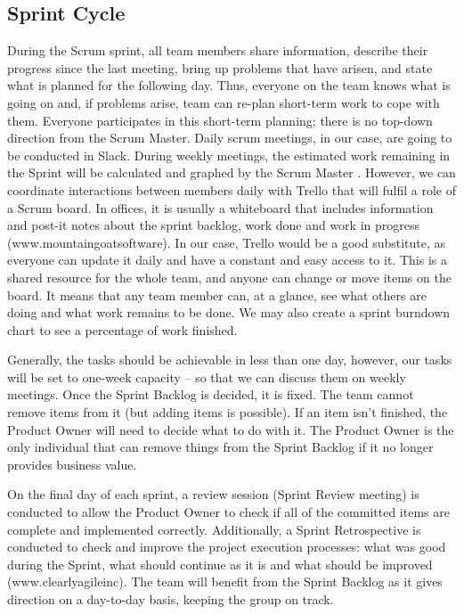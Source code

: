 \subsection{Sprint Cycle}

During the Scrum sprint, all team members share information, describe their progress since the last meeting, bring up problems that have arisen, and state what is planned for the following day. Thus, everyone on the team knows what is going on and, if problems arise, team can re-plan short-term work to cope with them. Everyone participates in this short-term planning; there is no top-down direction from the Scrum Master. Daily scrum meetings, in our case, are going to be conducted in Slack. During weekly meetings, the estimated work remaining in the Sprint will be calculated and graphed by the Scrum Master \cite[p. 87]{Sommerville}. However, we can coordinate interactions between members daily with Trello that will fulfil a role of a Scrum board. In offices, it is usually a whiteboard that includes information and post-it notes about the sprint backlog, work done and work in progress (www.mountaingoatsoftware). In our case, Trello would be a good substitute, as everyone can update it daily and have a constant and easy access to it. This is a shared resource for the whole team, and anyone can change or move items on the board. It means that any team member can, at a glance, see what others are doing and what work remains to be done. We may also create a sprint burndown chart to see a percentage of work finished.

Generally, the tasks should be achievable in less than one day, however, our tasks will be set to one-week capacity – so that we can discuss them on weekly meetings. Once the Sprint Backlog is decided, it is fixed. The team cannot remove items from it (but adding items is possible). If an item isn't finished, the Product Owner will need to decide what to do with it.  The Product Owner is the only individual that can remove things from the Sprint Backlog if it no longer provides business value.

On the final day of each sprint, a review session (Sprint Review meeting) is conducted to allow the Product Owner to check if all of the committed items are complete and implemented correctly. Additionally, a Sprint Retrospective is conducted to check and improve the project execution processes: what was good during the Sprint, what should continue as it is and what should be improved (www.clearlyagileinc). The team will benefit from the Sprint Backlog as it gives direction on a day-to-day basis, keeping the group on track.


